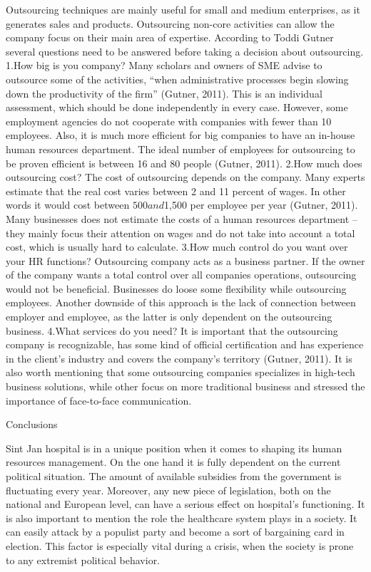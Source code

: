 \documentclass[a4paper,fleqn,11pt,dvips,titlepage]{article}
\numberwithin{figure}{section}
\numberwithin{equation}{section}
\begin{document}
Outsourcing techniques are mainly useful for small and medium enterprises, as it generates sales and products. Outsourcing non-core activities can allow the company focus on their main area of expertise. According to Toddi Gutner several questions need to be answered before taking a decision about outsourcing.
1.How big is you company? Many scholars and owners of SME advise to outsource some of the activities, “when administrative processes begin slowing down the productivity of the firm” (Gutner, 2011). This is an individual assessment, which should be done independently in every case. However, some employment agencies do not cooperate with companies with fewer than 10 employees. Also, it is much more efficient for big companies to have an in-house human resources department. The ideal number of employees for outsourcing to be proven efficient is between 16 and 80 people (Gutner, 2011).
2.How much does outsourcing cost? The cost of outsourcing depends on the company. Many experts estimate that the real cost varies between 2 and 11 percent of wages. In other words it would cost between $500 and $1,500 per employee per year (Gutner, 2011). Many businesses does not estimate the costs of a human resources department – they mainly focus their attention on wages and do not take into account a total cost, which is usually hard to calculate.
3.How much control do you want over your HR functions? Outsourcing company acts as a business partner. If the owner of the company wants a total control over all companies operations, outsourcing would not be beneficial. Businesses do loose some flexibility while outsourcing employees. Another downside of this approach is the lack of connection between employer and employee, as the latter is only dependent on the outsourcing business.
4.What services do you need? It is important that the outsourcing company is recognizable, has some kind of official certification and has experience in the client’s industry and covers the company’s territory (Gutner, 2011). It is also worth mentioning that some outsourcing companies specializes in high-tech business solutions, while other focus on more traditional business and stressed the importance of face-to-face communication. 


Conclusions

Sint Jan hospital is in a unique position when it comes to shaping its human resources management. On the one hand it is fully dependent on the current political situation. The amount of available subsidies from the government is fluctuating every year. Moreover, any new piece of legislation, both on the national and European level, can have a serious effect on hospital’s functioning. It is also important to mention the role the healthcare system plays in a society. It can easily attack by a populist party and become a sort of bargaining card in election. This factor is especially vital during a crisis, when the society is prone to any extremist political behavior. 
\end{document}
